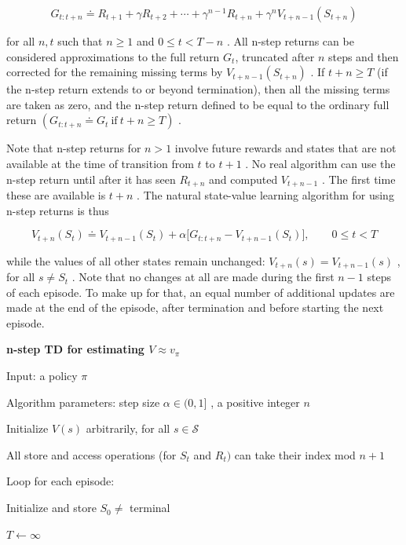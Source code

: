 \documentclass{article}
\begin{document}
$$
G _ { t : t + n } \doteq R _ { t + 1 } + \gamma R _ { t + 2 } + \cdots + \gamma ^ { n - 1 } R _ { t + n } + \gamma ^ { n } V _ { t + n - 1 } ( S _ { t + n } )
$$

for all $n , t$ such that $n \geq 1$ and $0 \leq t < T - n$ . All n-step returns can be considered approximations to the full return $G _ { t }$, truncated after $n$ steps and then corrected for the remaining 
missing terms by $V _ { t + n - 1 } ( S _ { t + n } )$ . If $t + n \geq T$ (if the n-step return extends to or beyond termination), then all the missing terms are taken as zero, 
and the n-step return defined to be equal to the ordinary full return $( G _ { t : t + n } \doteq G _ { t } { \mathrm { ~ i f ~ } } t + n \geq T )$ .

Note that n-step returns for $n > 1$ involve future rewards and states that are not available at the time of transition from $t$ to $t + 1$ . No real algorithm can use the n-step return until 
after it has seen $R _ { t + n }$ and computed $V _ { t + n - 1 }$ . The first time these are available is $t + n$ . The natural state-value learning algorithm for using n-step returns is thus

$$
V _ { t + n } ( S _ { t } ) \doteq V _ { t + n - 1 } ( S _ { t } ) + \alpha \big [ G _ { t : t + n } - V _ { t + n - 1 } ( S _ { t } ) \big ] , \qquad 0 \leq t < T
$$

while the values of all other states remain unchanged: $V _ { t + n } ( s ) = V _ { t + n - 1 } ( s )$ , for all $s   \neq   S _ { t }$ . Note that no changes at all are made during the first 
$n-1$ steps of each episode. To make up for that, an equal number of additional updates are made at the end of the episode, after termination and before starting the next episode.

\textbf{n-step TD for estimating $V \approx v _ { \pi }$}

Input: a policy $\pi$

Algorithm parameters: step size $\alpha \in ( 0 , 1 ]$ , a positive integer $n$

Initialize $V ( s )$ arbitrarily, for all $s \in \mathcal { S }$

All store and access operations (for $S _ { t }$ and $R _ { t } \Big )$ can take their index mod $n + 1$

Loop for each episode:

\hspace{.5cm} Initialize and store $S _ { 0 } \neq$ terminal

\hspace{.5cm} $T \leftarrow \infty$
\end{document}
